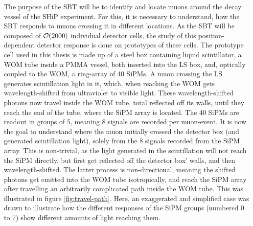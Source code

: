 	The purpose of the \ac{SBT} will be to identify and locate muons around the decay vessel of the \ac{SHiP} experiment. For this, it is necessary to understand, how the \ac{SBT} responds to muons crossing it in different locations. As the \ac{SBT} will be composed of $\order{2000}$ individual detector cells, the study of this position-dependent detector response is done on prototypes of these cells.
	The prototype cell used in this thesis is made up of a steel box containing liquid scintillator, a \ac{WOM} tube inside a \ac{PMMA} vessel, both inserted into the \ac{LS} box, and, optically coupled to the \ac{WOM}, a ring-array of \num{40} \acsp{SiPM}. A muon crossing the \ac{LS} generates scintillation light in it, which, when reaching the \ac{WOM} gets wavelength-shifted from ultraviolet to visible light. These wavelength-shifted photons now travel inside the \ac{WOM} tube, total reflected off its walls, until they reach the end of the tube, where the \ac{SiPM} array is located. The \num{40} \acsp{SiPM} are readout in groups of 5, meaning 8 signals are recorded per muon-event. 
	It is now the goal to understand where the muon initially crossed the detector box (and generated scintillation light), solely from the 8 signals recorded from the \ac{SiPM} array. This is non-trivial, as the light generated in the scintillation will not reach the \ac{SiPM} directly, but first get reflected off the detector box' walls, and then wavelength-shifted. The latter process is non-directional, meaning the shifted photons get emitted into the \ac{WOM} tube isotropically, and reach the \ac{SiPM} array after travelling an arbitrarily complicated path inside the \ac{WOM} tube. This was illustrated in figure \ref{fig:travel-path}. Here, an exaggerated and simplified case was drawn to illustrate how the different responses of the \ac{SiPM} groups (numbered 0 to 7) show different amounts of light reaching them. 
	
